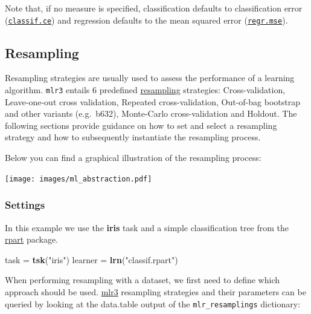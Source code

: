 \documentclass[]{article}
\newenvironment{Shaded}{\begin{snugshade}}{\end{snugshade}}
\newcommand{\KeywordTok}[1]{\textcolor[rgb]{0.13,0.29,0.53}{\textbf{#1}}}
\newcommand{\NormalTok}[1]{#1}
\newcommand{\StringTok}[1]{\textcolor[rgb]{0.31,0.60,0.02}{#1}}
\renewenvironment{Shaded} {\begin{snugshade}\small} {\end{snugshade}}
\begin{document}
Note that, if no measure is specified, classification defaults to classification error (\href{https://mlr3.mlr-org.com/reference/mlr_measures_classif.ce.html}{\texttt{classif.ce}}) and regression defaults to the mean squared error (\href{https://mlr3.mlr-org.com/reference/mlr_measures_regr.mse.html}{\texttt{regr.mse}}).

\hypertarget{resampling}{%
\subsection{Resampling}\label{resampling}}

Resampling strategies are usually used to assess the performance of a learning algorithm.
\texttt{mlr3} entails 6 predefined \protect\hyperlink{resampling}{resampling} strategies:
Cross-validation, Leave-one-out cross validation, Repeated cross-validation, Out-of-bag bootstrap and other variants (e.g.~b632), Monte-Carlo cross-validation and Holdout.
The following sections provide guidance on how to set and select a resampling strategy and how to subsequently instantiate the resampling process.

Below you can find a graphical illustration of the resampling process:

\texttt{[image: images/ml\_abstraction.pdf]}

\hypertarget{resampling-settings}{%
\subsubsection{Settings}\label{resampling-settings}}

In this example we use the \textbf{iris} task and a simple classification tree from the \href{https://cran.r-project.org/package=rpart}{rpart} package.

\begin{Shaded}
\begin{Highlighting}[]
\NormalTok{task =}\StringTok{ }\KeywordTok{tsk}\NormalTok{(}\StringTok{"iris"}\NormalTok{)}
\NormalTok{learner =}\StringTok{ }\KeywordTok{lrn}\NormalTok{(}\StringTok{"classif.rpart"}\NormalTok{)}
\end{Highlighting}
\end{Shaded}

When performing resampling with a dataset, we first need to define which approach should be used.
\href{https://mlr3.mlr-org.com}{mlr3} resampling strategies and their parameters can be queried by looking at the data.table output of the \texttt{mlr\_resamplings} dictionary:
\end{document}
